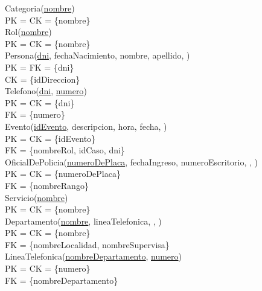 \documentclass[10pt,a4paper]{article}
\begin{document}
{\newline
Categoria(\underline{nombre})\\ 
	PK = CK = \{nombre\}\\ 

\newline
Rol(\underline{nombre})\\ 
	PK = CK = \{nombre\}\\ 

\newline
Persona(\underline{dni}, fechaNacimiento, nombre, apellido, )\\ 
	PK = FK = \{dni\}\\ 
	CK = \{idDireccion\}\\ 

\newline
Telefono(\underline{\underline{dni}}, \underline{numero})\\ 
	PK = CK = \{dni\}\\ 
	FK = \{numero\}\\ 

\newline
Evento(\underline{idEvento}, descripcion, hora, fecha, )\\ 
	PK = CK  = \{idEvento\}\\ 
	FK = \{nombreRol, idCaso, dni\}\\

\newline
OficialDePolicia(\underline{numeroDePlaca}, fechaIngreso, numeroEscritorio, , )\\
	PK = CK = \{numeroDePlaca\}\\ 
	FK = \{nombreRango\}\\

\newline
Servicio(\underline{nombre})\\ 
	PK = CK = \{nombre\}\\ 

\newline
Departamento(\underline{nombre}, lineaTelefonica, , )\\ 
	PK = CK = \{nombre\}\\ 
	FK = \{nombreLocalidad, nombreSupervisa\}\\

\newline
LineaTelefonica(\underline{\underline{nombreDepartamento}}, \underline{numero})\\ 
	PK = CK = \{numero\}\\ 
	FK = \{nombreDepartamento\}\\
	
}
\end{document}
